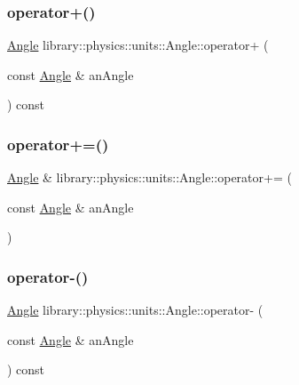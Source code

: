 \mbox{\label{classlibrary_1_1physics_1_1units_1_1_angle_aebf6869b414e02af92a924d561822824}} 
\subsubsection{\texorpdfstring{operator+()}{operator+()}}
{\footnotesize\ttfamily \hyperlink{classlibrary_1_1physics_1_1units_1_1_angle}{Angle} library\+::physics\+::units\+::\+Angle\+::operator+ (\begin{DoxyParamCaption}\item[{const \hyperlink{classlibrary_1_1physics_1_1units_1_1_angle}{Angle} \&}]{an\+Angle }\end{DoxyParamCaption}) const}

\mbox{\label{classlibrary_1_1physics_1_1units_1_1_angle_a5f20b012cb332e631a6271144a0817a2}} 
\subsubsection{\texorpdfstring{operator+=()}{operator+=()}}
{\footnotesize\ttfamily \hyperlink{classlibrary_1_1physics_1_1units_1_1_angle}{Angle} \& library\+::physics\+::units\+::\+Angle\+::operator+= (\begin{DoxyParamCaption}\item[{const \hyperlink{classlibrary_1_1physics_1_1units_1_1_angle}{Angle} \&}]{an\+Angle }\end{DoxyParamCaption})}

\mbox{\label{classlibrary_1_1physics_1_1units_1_1_angle_a034a88587139bb8642e80f353ead5ce2}} 
\subsubsection{\texorpdfstring{operator-\/()}{operator-()}}
{\footnotesize\ttfamily \hyperlink{classlibrary_1_1physics_1_1units_1_1_angle}{Angle} library\+::physics\+::units\+::\+Angle\+::operator-\/ (\begin{DoxyParamCaption}\item[{const \hyperlink{classlibrary_1_1physics_1_1units_1_1_angle}{Angle} \&}]{an\+Angle }\end{DoxyParamCaption}) const}

